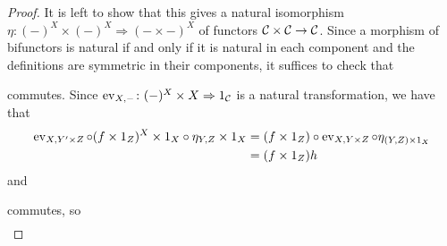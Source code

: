 \begin{solution}
\begin{exercises}
\begin{proof}
            It is left to show that this gives a natural isomorphism $\eta\colon (-)^X\times (-)^X\Rightarrow (-\times -)^X$ of functors $\mathcal{C}\times\mathcal{C}\to\mathcal{C}$.
            Since a morphism of bifunctors is natural if and only if it is natural in each component and the definitions are symmetric in their components, it suffices to check that
            \begin{center}
            \end{center}
            commutes.
            Since $\operatorname{ev}_{X, -}\colon (-)^X\times X\Rightarrow 1_{\mathcal{C}}$ is a natural transformation, we have that
            \begin{align*}
                \operatorname{ev}_{X,Y'\times Z}\circ (f\times 1_Z)^X\times 1_X\circ \eta_{Y,Z}\times 1_X&=(f\times 1_Z)\circ\operatorname{ev}_{X,Y\times Z}\circ\eta_{(Y,Z)\times 1_X}\\
                &=(f\times 1_Z) h
            \end{align*}
            and
            \begin{center}
            \end{center}
            commutes, so
            \begin{align*}

\end{align*}
\end{proof}
\end{exercises}
\end{solution}
